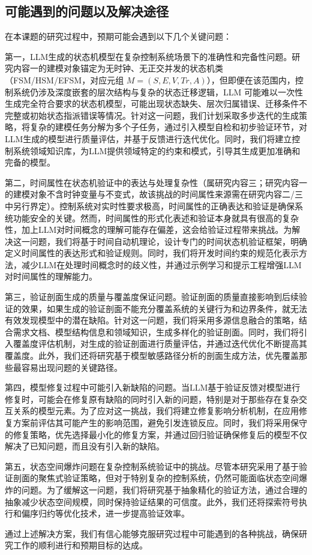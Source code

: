 \subsection{可能遇到的问题以及解决途径}
\label{section-plan-problems}

在本课题的研究过程中，预期可能会遇到以下几个关键问题：

第一，LLM生成的状态机模型在复杂控制系统场景下的准确性和完备性问题。研究内容一的建模对象锚定为无时钟、无正交并发的状态机类（FSM/HSM/EFSM，对应元组 $M = (S, E, V, Tr, A)$），但即便在该范围内，控制系统仍涉及深度嵌套的层次结构与复杂的状态迁移逻辑，LLM 可能难以一次性生成完全符合要求的状态机模型，可能出现状态缺失、层次归属错误、迁移条件不完整或初始状态指派错误等情况。针对这一问题，我们计划采取多步迭代的生成策略，将复杂的建模任务分解为多个子任务，通过引入模型自检和初步验证环节，对LLM生成的模型进行质量评估，并基于反馈进行迭代优化。同时，我们将建立控制系统领域知识库，为LLM提供领域特定的约束和模式，引导其生成更加准确和完备的模型。

第二，时间属性在状态机验证中的表达与处理复杂性（属研究内容三；研究内容一的建模对象不含时钟变量与不变式，故该挑战的时间属性来源需在研究内容二/三中另行界定）。控制系统对实时性要求极高，时间属性的正确表达和验证是确保系统功能安全的关键。然而，时间属性的形式化表述和验证本身就具有很高的复杂性，加上LLM对时间概念的理解可能存在偏差，这会给验证过程带来挑战。为解决这一问题，我们将基于时间自动机理论，设计专门的时间状态机验证框架，明确定义时间属性的表达形式和验证规则。同时，我们将开发时间约束的规范化表示方法，减少LLM在处理时间概念时的歧义性，并通过示例学习和提示工程增强LLM对时间属性的理解能力。

第三，验证剖面生成的质量与覆盖度保证问题。验证剖面的质量直接影响到后续验证的效果，如果生成的验证剖面不能充分覆盖系统的关键行为和边界条件，就无法有效发现模型中的潜在缺陷。针对这一问题，我们将采用多源信息融合的策略，结合需求文档、模型结构信息和领域知识，生成多样化的验证剖面。同时，我们将引入覆盖度评估机制，对生成的验证剖面进行质量评估，并通过迭代优化不断提高其覆盖度。此外，我们还将研究基于模型敏感路径分析的剖面生成方法，优先覆盖那些最容易出现问题的关键路径。

第四，模型修复过程中可能引入新缺陷的问题。当LLM基于验证反馈对模型进行修复时，可能会在修复原有缺陷的同时引入新的问题，特别是对于那些存在复杂交互关系的模型元素。为了应对这一挑战，我们将建立修复影响分析机制，在应用修复方案前评估其可能产生的影响范围，避免引发连锁反应。同时，我们将采用保守的修复策略，优先选择最小化的修复方案，并通过回归验证确保修复后的模型不仅解决了已知问题，而且没有引入新的缺陷。

第五，状态空间爆炸问题在复杂控制系统验证中的挑战。尽管本研究采用了基于验证剖面的聚焦式验证策略，但对于特别复杂的控制系统，仍然可能面临状态空间爆炸的问题。为了缓解这一问题，我们将研究基于抽象精化的验证方法，通过合理的抽象减少状态空间规模，同时保持验证结果的可信度。此外，我们还将探索符号执行和偏序归约等优化技术，进一步提高验证效率。

通过上述解决方案，我们有信心能够克服研究过程中可能遇到的各种挑战，确保研究工作的顺利进行和预期目标的达成。
